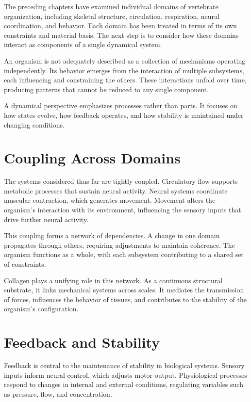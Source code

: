 \documentclass[11pt,oneside]{book}
\begin{document}
The preceding chapters have examined individual domains of vertebrate organization, including skeletal structure, circulation, respiration, neural coordination, and behavior. Each domain has been treated in terms of its own constraints and material basis. The next step is to consider how these domains interact as components of a single dynamical system.

An organism is not adequately described as a collection of mechanisms operating independently. Its behavior emerges from the interaction of multiple subsystems, each influencing and constraining the others. These interactions unfold over time, producing patterns that cannot be reduced to any single component.

A dynamical perspective emphasizes processes rather than parts. It focuses on how states evolve, how feedback operates, and how stability is maintained under changing conditions.

\section{Coupling Across Domains}

The systems considered thus far are tightly coupled. Circulatory flow supports metabolic processes that sustain neural activity. Neural systems coordinate muscular contraction, which generates movement. Movement alters the organism’s interaction with its environment, influencing the sensory inputs that drive further neural activity.

This coupling forms a network of dependencies. A change in one domain propagates through others, requiring adjustments to maintain coherence. The organism functions as a whole, with each subsystem contributing to a shared set of constraints.

Collagen plays a unifying role in this network. As a continuous structural substrate, it links mechanical systems across scales. It mediates the transmission of forces, influences the behavior of tissues, and contributes to the stability of the organism’s configuration.

\section{Feedback and Stability}

Feedback is central to the maintenance of stability in biological systems. Sensory inputs inform neural control, which adjusts motor output. Physiological processes respond to changes in internal and external conditions, regulating variables such as pressure, flow, and concentration.
\end{document}
